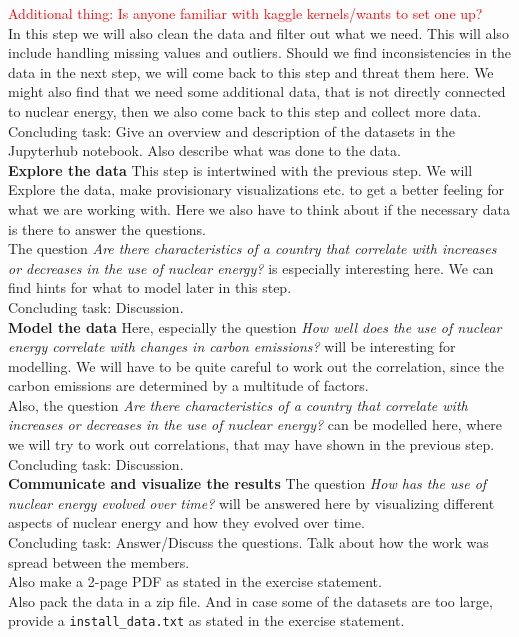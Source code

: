 \documentclass[a4paper,11pt]{article}
\begin{document}
\textcolor{red}{Additional thing: Is anyone familiar with kaggle kernels/wants to set one up?}\\

In this step we will also clean the data and filter out what we need.
This will also include handling missing values and outliers. Should we find inconsistencies in the data in the next step,
we will come back to this step and threat them here. We might also find that we need some additional data, that is not directly
connected to nuclear energy, then we also come back to this step and collect more data.\\

Concluding task: Give an overview and description of the datasets in the Jupyterhub notebook. Also describe what was done to the data.\\ 

\textbf{Explore the data} This step is intertwined with the previous step. We will Explore the data, make provisionary visualizations etc. to
get a better feeling for what we are working with. Here we also have to think about if the necessary data is there to
answer the questions.\\
The question \textit{Are there characteristics of a country
that correlate with increases or decreases in the use of nuclear energy?} is especially interesting here. We can find hints
for what to model later in this step.\\

Concluding task: Discussion.\\


\textbf{Model the data} Here, especially the question \textit{How well does the use of nuclear
energy correlate with changes in carbon emissions?} will be interesting for modelling. We will 
have to be quite careful to work out the correlation, since the carbon emissions are determined by a multitude of factors.\\
Also, the question \textit{Are there characteristics of a country
that correlate with increases or decreases in the use of nuclear energy?} can be modelled here, where we will try to work out 
correlations, that may have shown in the previous step.\\

Concluding task: Discussion.\\


\textbf{Communicate and visualize the results} The question \textit{How has the use of nuclear energy evolved over time?} will be answered here by visualizing different
aspects of nuclear energy and how they evolved over time.\\

Concluding task: Answer/Discuss the questions. Talk about how the work was spread between the members.\\
Also make a 2-page PDF as stated in the exercise statement.\\
Also pack the data in a zip file. And in case some of the datasets are too large, provide a \texttt{install\_data.txt} as 
stated in the exercise statement.\\
\end{document}
